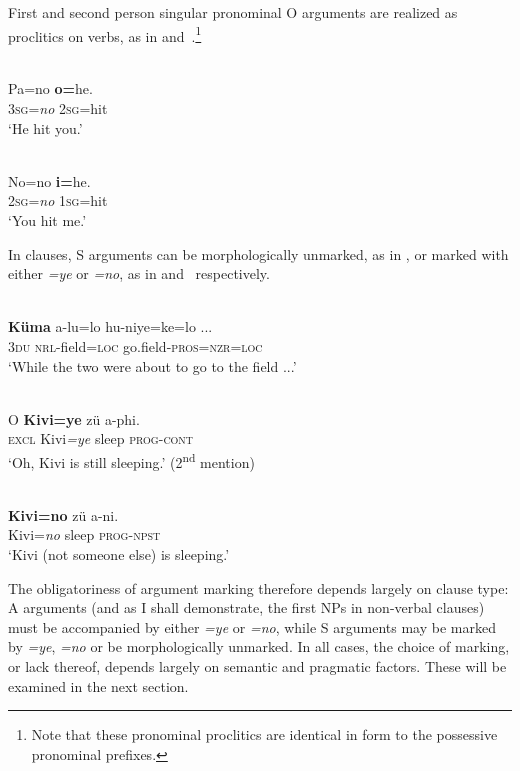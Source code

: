 \documentclass[output=paper]{LSP/langsci}
\begin{document}
First and second person singular pronominal O arguments are realized as proclitics on verbs, as in  and~.\footnote{Note that these pronominal proclitics are identical in form to the possessive pronominal prefixes.}

\ea\label{13-te-ex:4}
\\
\gll  Pa=no \textbf{o=}he.\\
\textsc{3sg=}\textit{no} \textsc{2sg}=hit\\
\glt ‘He hit you.’  %
\z

\ea\label{13-te-ex:5}
\\
\gll  No=no \textbf{i=}he.\\
\textsc{2sg=}\textit{no} \textsc{1sg}=hit\\
\glt ‘You hit me.’ %
\z

In  clauses, S arguments can be morphologically unmarked, as in , or marked with either \textit{=ye} or \textit{=no}, as in  and~ respectively.

\ea\label{13-te-ex:6}
\\
\gll  \textbf{Küma} a-lu=lo hu-niye=ke=lo {...}\\
3\textsc{du} \textsc{nrl}-field=\textsc{loc} go.field-\textsc{pros=nzr=loc}\\
\glt ‘While the two were about to go to the field ...’ %
\z

\ea\label{13-te-ex:7}
\\
\gll  O \textbf{Kivi=ye} zü a-phi.\\
\textsc{excl} Kivi\textit{=ye} sleep \textsc{prog}-\textsc{cont}\\
\glt ‘Oh, Kivi is still sleeping.’ (2\textsuperscript{nd} mention) %
\z

\ea\label{13-te-ex:8}
\\
\gll  \textbf{Kivi=no} zü a-ni.\\
Kivi=\textit{no} sleep \textsc{prog}-\textsc{npst}\\
\glt ‘Kivi (not someone else) is sleeping.’ %
\z

The obligatoriness of argument marking therefore depends largely on clause type: A arguments (and as I shall demonstrate, the first NPs in non-verbal clauses) must be accompanied by either \textit{=ye} or \textit{=no}, while S arguments may be marked by \textit{=ye}, \textit{=no} or be morphologically unmarked. 
In all cases, the choice of marking, or lack thereof, depends largely on semantic and pragmatic factors. 
These will be examined in the next section.
\end{document}
